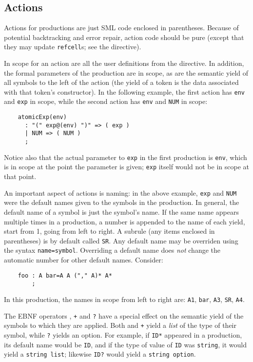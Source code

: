 \subsection{Actions}\label{sec:antlr-actions}

Actions for productions are just SML code enclosed in parentheses.  Because of potential backtracking and error repair, action code should be pure (except that they may update \antlr{} {\tt refcell}s; see the  directive).

In scope for an action are all the user definitions from the  directive.  In addition, the formal parameters of the production are in scope, as are the semantic yield of all symbols to the left of the action (the yield of a token is the data associated with that token's constructor).  In the following example, the first action has {\tt env} and {\tt exp} in scope, while the second action has {\tt env} and {\tt NUM} in scope:
\begin{verbatim}
    atomicExp(env)
      : "(" exp@(env) ")" => ( exp )
      | NUM => ( NUM )
      ;
\end{verbatim}
Notice also that the actual parameter to {\tt exp} in the first production is {\tt env}, which is in scope at the point the parameter is given; {\tt exp} itself would not be in scope at that point.

An important aspect of actions is naming: in the above example, {\tt exp} and {\tt NUM} were the default names given to the symbols in the production.  In general, the default name of a symbol is just the symbol's name.  If the same name appears multiple times in a production, a number is appended to the name of each yield, start from 1, going from left to right.  A subrule (any items enclosed in parentheses) is by default called {\tt SR}.  Any default name may be overriden using the syntax {\tt name=symbol}.  Overriding a default name does \emph{not} change the automatic number for other default names.  Consider:
\begin{verbatim}
    foo : A bar=A A ("," A)* A*
        ;
\end{verbatim}
In this production, the names in scope from left to right are: {\tt A1}, {\tt bar}, {\tt A3}, {\tt SR}, {\tt A4}.

The EBNF operators {\tt *}, {\tt +} and {\tt ?} have a special effect on the semantic yield of the symbols to which they are applied.  Both {\tt *} and {\tt +} yield a \emph{list} of the type of their symbol, while {\tt ?} yields an option.  For example, if {\tt ID*} appeared in a production, its default name would be {\tt ID}, and if the type of value of {\tt ID} was {\tt string}, it would yield a {\tt string list}; likewise {\tt ID?} would yield a {\tt string option}.  

